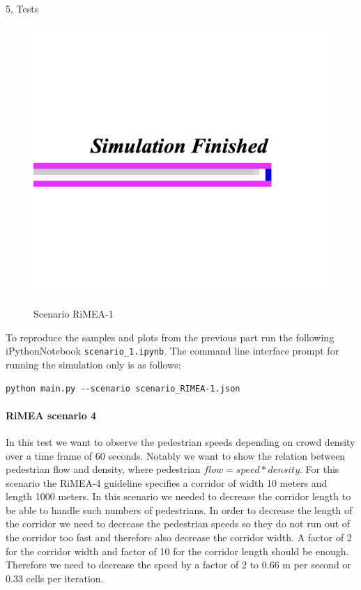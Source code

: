 \begin{task}{5, Tests}
\begin{figure}[H]
{    \includegraphics[scale=0.35]{report-template/image/rimea-1-fin.png}}
  \caption{Scenario RiMEA-1}
  \label{fig:rimea1}
\end{figure}

To reproduce the samples and plots from the previous part run the following iPythonNotebook \texttt{scenario\_1.ipynb}. The command line interface prompt for running the simulation only is as follows:
\begin{verbatim}
python main.py --scenario scenario_RIMEA-1.json
\end{verbatim}

\paragraph{RiMEA scenario 4}
In this test we want to observe the pedestrian speeds depending on crowd density over a time frame of 60 seconds. Notably we want to show the relation between pedestrian flow and density, where pedestrian $flow = speed * density$. For this scenario the RiMEA-4 guideline specifies a corridor of width 10 meters and length 1000 meters. In this scenario we needed to decrease the corridor length to be able to handle such numbers of pedestrians. In order to decrease the length of the corridor we need to decrease the pedestrian speeds so they do not run out of the corridor too fast and therefore also decrease the corridor width. A factor of 2 for the corridor width and factor of 10 for the corridor length should be enough. Therefore we need to decrease the speed by a factor of 2 to 0.66 m per second or 0.33 cells per iteration.


\end{task}
